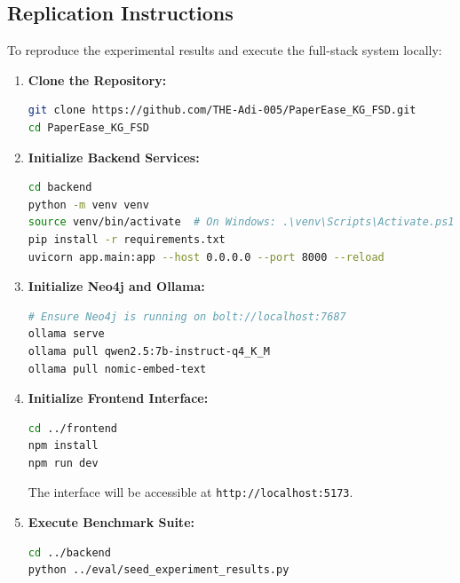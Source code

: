 \documentclass[12pt,a4paper,oneside]{report}
\begin{document}
\subsection*{Replication Instructions}
To reproduce the experimental results and execute the full-stack system locally:
\begin{enumerate}
    \item \textbf{Clone the Repository:}
    \begin{lstlisting}[language=bash]
git clone https://github.com/THE-Adi-005/PaperEase_KG_FSD.git
cd PaperEase_KG_FSD
    \end{lstlisting}
    
    \item \textbf{Initialize Backend Services:}
    \begin{lstlisting}[language=bash]
cd backend
python -m venv venv
source venv/bin/activate  # On Windows: .\venv\Scripts\Activate.ps1
pip install -r requirements.txt
uvicorn app.main:app --host 0.0.0.0 --port 8000 --reload
    \end{lstlisting}
    
    \item \textbf{Initialize Neo4j and Ollama:}
    \begin{lstlisting}[language=bash]
# Ensure Neo4j is running on bolt://localhost:7687
ollama serve
ollama pull qwen2.5:7b-instruct-q4_K_M
ollama pull nomic-embed-text
    \end{lstlisting}
    
    \item \textbf{Initialize Frontend Interface:}
    \begin{lstlisting}[language=bash]
cd ../frontend
npm install
npm run dev
    \end{lstlisting}
    The interface will be accessible at \texttt{http://localhost:5173}.
    
    \item \textbf{Execute Benchmark Suite:}
    \begin{lstlisting}[language=bash]
cd ../backend
python ../eval/seed_experiment_results.py
    \end{lstlisting}
\end{enumerate}

\end{document}
